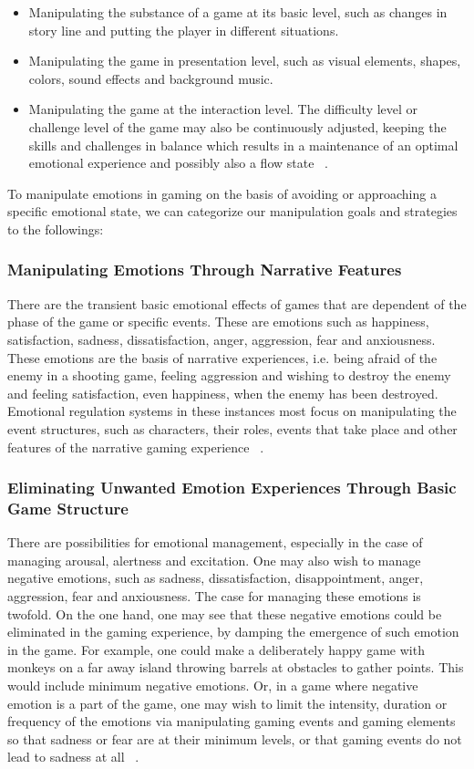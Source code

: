\begin{itemize}
\item Manipulating the substance of a game at its basic level, such as changes in story line and putting the player in different situations.
\item Manipulating the game in presentation level, such as visual elements, shapes, colors, sound effects and background music.
\item Manipulating the game at the interaction level. The difficulty level or challenge level of the game may also be continuously adjusted, keeping the skills and challenges in balance which results in a maintenance of an optimal emotional experience and possibly also a flow state ~\cite{saari2005emotional}.
\end{itemize}

To manipulate emotions in gaming on the basis of avoiding or approaching a specific emotional state, we can categorize our manipulation goals and strategies to the followings:

\subsubsection{Manipulating Emotions Through Narrative Features} There are the transient basic emotional effects of games that are dependent of the phase of the game or specific events. These are emotions such as happiness, satisfaction, sadness, dissatisfaction, anger, aggression, fear and anxiousness. These emotions are the basis of narrative experiences, i.e. being afraid of the enemy in a shooting game, feeling aggression and wishing to destroy the enemy and feeling satisfaction, even happiness, when the enemy has been destroyed. Emotional regulation systems in these instances most focus on manipulating the event structures, such as characters, their roles, events that take place and other features of the narrative gaming experience ~\cite{saari2005emotional}.

\subsubsection{Eliminating Unwanted Emotion Experiences Through Basic Game Structure} There are possibilities for emotional management, especially in the case of managing arousal, alertness and excitation. One may also wish to manage negative emotions, such as sadness, dissatisfaction, disappointment, anger, aggression, fear and anxiousness. The case for managing these emotions is twofold. On the one hand, one may see that these negative emotions could be eliminated in the gaming experience, by damping the emergence of such emotion in the game. For example, one could make a deliberately happy game with monkeys on a far away island throwing barrels at obstacles to gather points. This would include minimum negative emotions. Or, in a game where negative emotion is a part of the game, one may wish to limit the intensity, duration or frequency of the emotions via manipulating gaming events and gaming elements so that sadness or fear are at their minimum levels, or that gaming events do not lead to sadness at all ~\cite{saari2005emotional}.

